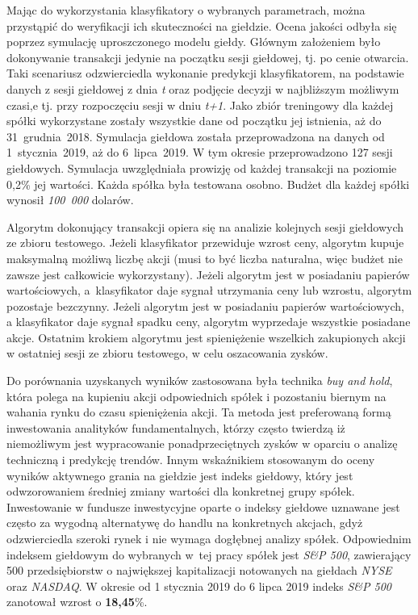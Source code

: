 \documentclass[a4paper, twoside, 11pt, openright]{article}
\begin{document}
Mając do wykorzystania klasyfikatory o wybranych parametrach, można przystąpić do weryfikacji ich skuteczności na giełdzie. Ocena jakości odbyła się poprzez symulację uproszczonego modelu giełdy. Głównym założeniem było dokonywanie transakcji jedynie na początku sesji giełdowej, tj. po cenie otwarcia. Taki scenariusz odzwierciedla wykonanie predykcji klasyfikatorem, na podstawie danych z sesji giełdowej z dnia \textit{t} oraz podjęcie decyzji w najbliższym możliwym czasi,e tj. przy rozpoczęciu sesji w dniu \textit{t+1}. Jako zbiór treningowy dla każdej spółki wykorzystane zostały wszystkie dane od początku jej istnienia, aż do 31~grudnia~2018. Symulacja giełdowa została przeprowadzona na danych od 1~stycznia~2019, aż do 6~lipca~2019. W tym okresie przeprowadzono 127 sesji giełdowych. Symulacja uwzględniała prowizję od każdej transakcji na poziomie 0,2\% jej wartości. Każda spółka była testowana osobno. Budżet dla każdej spółki wynosił \textit{100~000} dolarów.

\bigskip

Algorytm dokonujący transakcji opiera się na analizie kolejnych sesji giełdowych ze zbioru testowego. Jeżeli klasyfikator przewiduje wzrost ceny, algorytm kupuje maksymalną możliwą liczbę akcji (musi to być liczba naturalna, więc budżet nie zawsze jest całkowicie wykorzystany). Jeżeli algorytm jest w posiadaniu papierów wartościowych, a~klasyfikator daje sygnał utrzymania ceny lub wzrostu, algorytm pozostaje bezczynny. Jeżeli algorytm jest w posiadaniu papierów wartościowych, a klasyfikator daje sygnał spadku ceny, algorytm wyprzedaje wszystkie posiadane akcje. Ostatnim krokiem algorytmu jest spieniężenie wszelkich zakupionych akcji w ostatniej sesji ze zbioru testowego, w celu oszacowania zysków.

\bigskip

Do porównania uzyskanych wyników zastosowana była technika \textit{buy and hold}, która polega na kupieniu akcji odpowiednich spółek i pozostaniu biernym na wahania rynku do czasu spieniężenia akcji. Ta metoda jest preferowaną formą inwestowania analityków fundamentalnych, którzy często twierdzą iż niemożliwym jest wypracowanie ponadprzeciętnych zysków w oparciu o analizę techniczną i predykcję trendów. Innym wskaźnikiem stosowanym do oceny wyników aktywnego grania na giełdzie jest indeks giełdowy, który jest odwzorowaniem średniej zmiany wartości dla konkretnej grupy spółek. Inwestowanie w fundusze inwestycyjne oparte o indeksy giełdowe uznawane jest często za wygodną alternatywę do handlu na konkretnych akcjach, gdyż odzwierciedla szeroki rynek i nie wymaga dogłębnej analizy spółek. Odpowiednim indeksem giełdowym do wybranych w~tej pracy spółek jest \textit{S\&P 500}, zawierający 500 przedsiębiorstw o największej kapitalizacji notowanych na giełdach \textit{NYSE} oraz \textit{NASDAQ}. W okresie od 1 stycznia 2019 do 6 lipca 2019 indeks \textit{S\&P 500} zanotował wzrost o \textbf{18,45}\%.
\end{document}
